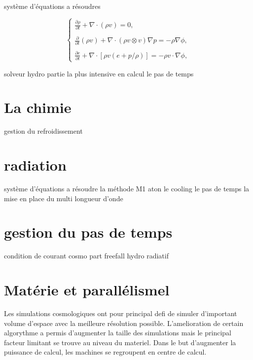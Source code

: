 système d'équations a résoudres

\begin{equation}
\begin{cases}

{ \frac{ \partial \rho }{ \partial t } + \nabla \cdot (\rho v) = 0}, \\
\\
{ \frac{ \partial }{ \partial t } (\rho v) + \nabla \cdot (\rho v \otimes v ) \nabla p = -\rho\nabla \phi }, \\
\\
{ \frac{ \partial e }{ \partial t } + \nabla \cdot [ \rho v (e+p/\rho) ] = -\rho v \cdot \nabla \phi },

\end{cases}
\end{equation}
\label{eq:hydro}



solveur hydro
partie la plus intensive en calcul
le pas de temps

\section{La chimie}

gestion du refroidissement

\section{radiation}

système d'équations a résoudre
la méthode M1
aton
le cooling
le pas de temps
la mise en place du multi longueur d'onde

\section{gestion du pas de temps}

condition de courant
cosmo
part
freefall
hydro
radiatif

\section{Matérie et parallélismel}

Les simulations cosmologiques ont pour principal defi de simuler d'important volume d'espace avec la meilleure résolution possible.
L'amelioration de certain algorythme a permis d'augmenter la taille des simulations mais le principal facteur limitant se trouve au niveau du materiel.
Dans le but d'augmenter la puissance de calcul, les machines se regroupent en centre de calcul.

